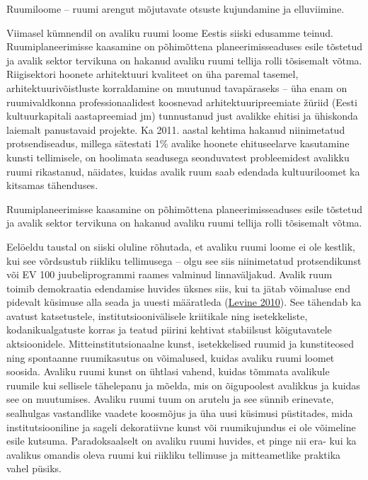 \documentclass[estonian,]{article}
\begin{document}
\begin{blockquote-left}
Ruumiloome -- ruumi arengut mõjutavate otsuste kujundamine ja
elluviimine.
\end{blockquote-left}

Viimasel kümnendil on avaliku ruumi loome Eestis siiski edusamme teinud. Ruumiplaneerimisse kaasamine on põhimõttena planeerimisseaduses esile tõstetud ja avalik sektor tervikuna on hakanud avaliku ruumi tellija rolli tõsisemalt võtma. Riigisektori hoonete arhitektuuri kvaliteet on üha paremal tasemel, arhitektuurivõistluste korraldamine on muutunud tavapäraseks -- üha enam on ruumivaldkonna professionaalidest koosnevad arhitektuuripreemiate žüriid (Eesti kultuurkapitali aastapreemiad jm) tunnustanud just avalikke ehitisi ja ühiskonda laiemalt panustavaid projekte. Ka 2011. aastal kehtima hakanud niinimetatud protsendiseadus, millega sätestati 1\% avalike hoonete ehituseelarve kasutamine kunsti tellimisele, on hoolimata seadusega seonduvatest probleemidest avalikku ruumi rikastanud, näidates, kuidas avalik ruum saab edendada kultuuriloomet ka kitsamas tähenduses.

\begin{blockquote-right}
Ruumiplaneerimisse kaasamine on põhimõttena planeerimisseaduses esile
tõstetud ja avalik sektor tervikuna on hakanud avaliku ruumi tellija
rolli tõsisemalt võtma.
\end{blockquote-right}

Eelöeldu taustal on siiski oluline rõhutada, et avaliku ruumi loome ei ole kestlik, kui see võrdsustub riikliku tellimusega -- olgu see siis niinimetatud protsendikunst või EV 100 juubeliprogrammi raames valminud linnaväljakud. Avalik ruum toimib demokraatia edendamise huvides üksnes siis, kui ta jätab võimaluse end pidevalt küsimuse alla seada ja uuesti määratleda (\protect\hyperlink{Levine2010}{Levine 2010}). See tähendab ka avatust katsetustele, institutsioonivälisele kriitikale ning isetekkeliste, kodanikualgatuste korras ja teatud piirini kehtivat stabiilsust kõigutavatele aktsioonidele. Mitteinstitutsionaalne kunst, isetekkelised ruumid ja kunstiteosed ning spontaanne ruumikasutus on võimalused, kuidas avaliku ruumi loomet soosida. Avaliku ruumi kunst on ühtlasi vahend, kuidas tõmmata avalikule ruumile kui sellisele tähelepanu ja mõelda, mis on õigupoolest avalikkus ja kuidas see on muutumises. Avaliku ruumi tuum on arutelu ja see sünnib erinevate, sealhulgas vastandlike vaadete koosmõjus ja üha uusi küsimusi püstitades, mida institutsiooniline ja sageli dekoratiivne kunst või ruumikujundus ei ole võimeline esile kutsuma. Paradoksaalselt on avaliku ruumi huvides, et pinge nii era- kui ka avalikus omandis oleva ruumi kui riikliku tellimuse ja mitteametlike praktika vahel püsiks.
\end{document}
